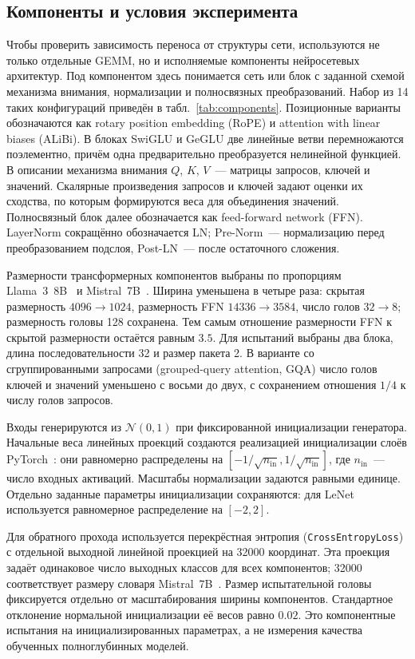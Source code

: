 \subsection{Компоненты и условия эксперимента}

Чтобы проверить зависимость переноса от структуры сети, используются
не только отдельные GEMM, но и исполняемые компоненты нейросетевых
архитектур. Под компонентом здесь понимается сеть или блок с заданной
схемой механизма внимания, нормализации и полносвязных преобразований.
Набор из 14 таких конфигураций приведён в табл.~\ref{tab:components}.
Позиционные варианты обозначаются как rotary position embedding (RoPE)
и attention with linear biases (ALiBi).
В блоках SwiGLU и GeGLU две линейные ветви перемножаются поэлементно,
причём одна предварительно преобразуется нелинейной функцией.
В описании механизма внимания $Q$, $K$, $V$~--- матрицы запросов, ключей
и значений. Скалярные произведения запросов и ключей задают оценки
их сходства, по которым формируются веса для объединения значений.
Полносвязный блок далее обозначается как feed-forward network (FFN).
LayerNorm сокращённо обозначается LN; Pre-Norm~--- нормализацию перед
преобразованием подслоя, Post-LN~--- после остаточного сложения.

Размерности трансформерных компонентов выбраны по пропорциям
Llama~3~8B~\cite{Dubey2024} и Mistral~7B~\cite{Jiang2023}.
Ширина уменьшена в четыре раза: скрытая размерность $4096\to1024$,
размерность FFN $14336\to3584$, число голов $32\to8$;
размерность головы 128 сохранена. Тем самым отношение размерности FFN
к скрытой размерности остаётся равным $3.5$.
Для испытаний выбраны два блока, длина последовательности 32
и размер пакета 2. В варианте со сгруппированными запросами
(grouped-query attention, GQA) число голов ключей и значений уменьшено
с восьми до двух, с сохранением отношения $1/4$ к числу голов запросов.

Входы генерируются из $\mathcal{N}(0,1)$ при фиксированной
инициализации генератора. Начальные веса линейных проекций создаются
реализацией инициализации слоёв PyTorch~\cite{Paszke2019}:
они равномерно распределены на
$[-1/\sqrt{n_{\mathrm{in}}},1/\sqrt{n_{\mathrm{in}}}]$,
где $n_{\mathrm{in}}$~--- число входных активаций.
Масштабы нормализации задаются равными единице.
Отдельно заданные параметры инициализации сохраняются:
для LeNet используется равномерное распределение на $[-2,2]$.

Для обратного прохода используется перекрёстная энтропия
(\texttt{CrossEntropyLoss}) с отдельной выходной линейной проекцией
на 32000 координат. Эта проекция задаёт одинаковое число выходных
классов для всех компонентов; 32000 соответствует размеру словаря
Mistral~7B~\cite{Jiang2023}. Размер испытательной головы фиксируется
отдельно от масштабирования ширины компонентов.
Стандартное отклонение нормальной инициализации её весов равно $0.02$.
Это компонентные испытания на инициализированных параметрах,
а не измерения качества обученных полноглубинных моделей.


